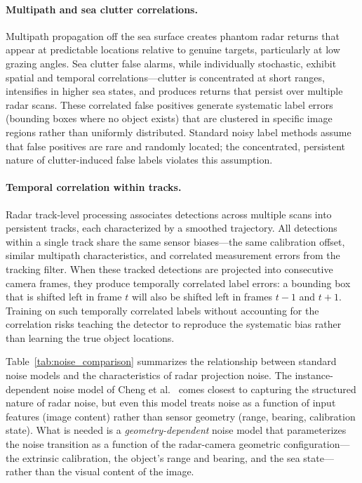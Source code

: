 \paragraph{Multipath and sea clutter correlations.} Multipath propagation off the sea surface creates phantom radar returns that appear at predictable locations relative to genuine targets, particularly at low grazing angles. Sea clutter false alarms, while individually stochastic, exhibit spatial and temporal correlations---clutter is concentrated at short ranges, intensifies in higher sea states, and produces returns that persist over multiple radar scans. These correlated false positives generate systematic label errors (bounding boxes where no object exists) that are clustered in specific image regions rather than uniformly distributed. Standard noisy label methods assume that false positives are rare and randomly located; the concentrated, persistent nature of clutter-induced false labels violates this assumption.

\paragraph{Temporal correlation within tracks.} Radar track-level processing associates detections across multiple scans into persistent tracks, each characterized by a smoothed trajectory. All detections within a single track share the same sensor biases---the same calibration offset, similar multipath characteristics, and correlated measurement errors from the tracking filter. When these tracked detections are projected into consecutive camera frames, they produce temporally correlated label errors: a bounding box that is shifted left in frame $t$ will also be shifted left in frames $t-1$ and $t+1$. Training on such temporally correlated labels without accounting for the correlation risks teaching the detector to reproduce the systematic bias rather than learning the true object locations.

Table~\ref{tab:noise_comparison} summarizes the relationship between standard noise models and the characteristics of radar projection noise. The instance-dependent noise model of Cheng et al.~\cite{cheng2022instance} comes closest to capturing the structured nature of radar noise, but even this model treats noise as a function of input features (image content) rather than sensor geometry (range, bearing, calibration state). What is needed is a \emph{geometry-dependent} noise model that parameterizes the noise transition as a function of the radar-camera geometric configuration---the extrinsic calibration, the object's range and bearing, and the sea state---rather than the visual content of the image.

